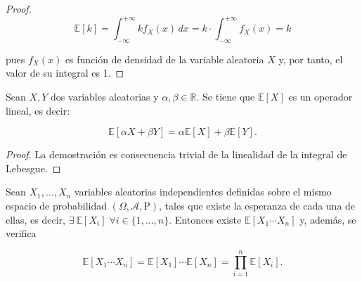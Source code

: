 \begin{proof}
    \[ \mathbb{E}[k] = \int_{-\infty}^{+\infty} k f_{X}(x) \, dx = k\cdot \int_{-\infty}^{+\infty} f_{X}(x) = k \]

    pues $f_{X}(x)$ es función de densidad de la variable aleatoria $X$ y, por tanto, el valor de su integral es 1.\newline
\end{proof}

\begin{proposicion}
    Sean $X, Y$ dos variables aleatorias y $\alpha, \beta \in \mathbb{R}$. Se tiene que $\mathbb{E}[X]$ es un operador lineal, es decir:

    \[ \mathbb{E}[\alpha X + \beta Y] = \alpha\mathbb{E}[X] + \beta\mathbb{E}[Y]. \]\newline
\end{proposicion}

\begin{proof}
    La demostración es consecuencia trivial de la linealidad de la integral de Lebesgue.\newline
\end{proof}

\begin{teorema}
    Sean $X_1, \ldots, X_n$ variables aleatorias independientes definidas sobre el mismo espacio de probabilidad $(\Omega, \mathcal{A}, \mathrm{P})$, tales que existe la esperanza de cada una de ellas, es decir, $\exists \ \mathbb{E}[X_i] \; \forall i \in \{1, \ldots, n \}$. Entonces existe $\mathbb{E}[X_1 \cdots X_n]$ y, además, se verifica

    \[ \mathbb{E}[X_1 \cdots X_n] = \mathbb{E}[X_1] \cdots \mathbb{E}[X_n] = \prod_{i=1}^n \mathbb{E}[X_i]. \]\newline
\end{teorema}

